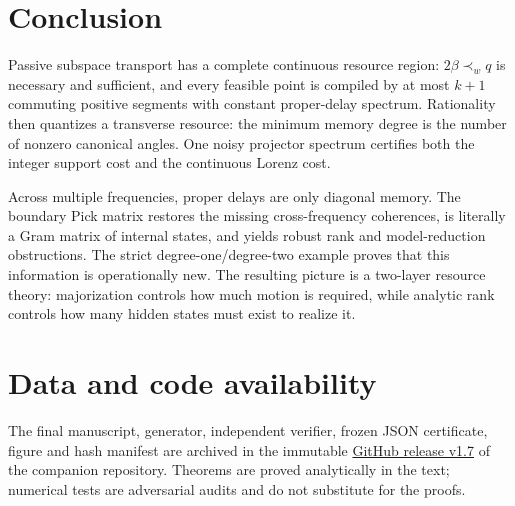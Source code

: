 \documentclass[11pt]{article}
\theoremstyle{definition}
\theoremstyle{remark}
\begin{document}
\section{Conclusion}

Passive subspace transport has a complete continuous resource region:
$2\beta\prec_wq$ is necessary and sufficient, and every feasible point is
compiled by at most $k+1$ commuting positive segments with constant proper-delay
spectrum.  Rationality then quantizes a transverse resource: the minimum
memory degree is the number of nonzero canonical angles.  One noisy projector
spectrum certifies both the integer support cost and the continuous Lorenz
cost.

Across multiple frequencies, proper delays are only diagonal memory.  The
boundary Pick matrix restores the missing cross-frequency coherences, is
literally a Gram matrix of internal states, and yields robust rank and
model-reduction obstructions.  The strict degree-one/degree-two example proves
that this information is operationally new.  The resulting picture is a
two-layer resource theory: majorization controls how much motion is required,
while analytic rank controls how many hidden states must exist to realize it.

\section*{Data and code availability}

The final manuscript, generator, independent verifier, frozen JSON
certificate, figure and hash manifest are archived in the immutable
\href{https://github.com/lluiseriksson/finite-sample-spectral-certificates/releases/tag/v1.7-complete-continuous-delay-regions}{GitHub release v1.7}
of the companion repository.
Theorems are proved analytically in the text; numerical tests are adversarial
audits and do not substitute for the proofs.



\end{document}
